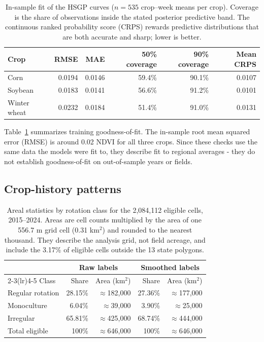 \documentclass[10pt,letterpaper]{article}
\begin{document}
\begin{table}[!htbp]
\centering\small
\begin{tabular}{@{}lrrrrr@{}}
\toprule
Crop & RMSE & MAE & 50\% coverage & 90\% coverage & Mean CRPS \\
\midrule
Corn & 0.0194 & 0.0146 & 59.4\% & 90.1\% & 0.0107 \\
Soybean & 0.0183 & 0.0141 & 56.6\% & 91.2\% & 0.0101 \\
Winter wheat & 0.0232 & 0.0184 & 51.4\% & 91.0\% & 0.0131 \\
\bottomrule
\end{tabular}
\caption{In-sample fit of the HSGP curves ($n=535$ crop--week means per crop). Coverage is the share of observations inside the stated posterior predictive band. The continuous ranked probability score (CRPS) rewards predictive distributions that are both accurate and sharp; lower is better.}
\label{tab:fit}
\end{table}

Table~\ref{tab:fit} summarizes training goodness-of-fit. The in-sample root mean squared error (RMSE) is around 0.02 NDVI for all three crops. Since these checks use the same data the models were fit to, they describe fit to regional averages - they do not establish goodness-of-fit on out-of-sample years or fields.

\FloatBarrier\subsection{Crop-history patterns}\label{sec:result-rotation}

\begin{table}[!htbp]
\centering\small
\begin{tabular}{@{}lrrrr@{}}
\toprule
& \multicolumn{2}{c}{Raw labels} & \multicolumn{2}{c}{Smoothed labels} \\
\cmidrule(lr){2-3}\cmidrule(lr){4-5}
Class & Share & Area (km$^2$) & Share & Area (km$^2$) \\
\midrule
Regular rotation & 28.15\% & $\approx$182,000 & 27.36\% & $\approx$177,000 \\
Monoculture & 6.04\% & $\approx$39,000 & 3.90\% & $\approx$25,000 \\
Irregular & 65.81\% & $\approx$425,000 & 68.74\% & $\approx$444,000 \\
Total eligible & 100\% & $\approx$646,000 & 100\% & $\approx$646,000 \\
\bottomrule
\end{tabular}
\caption{Areal statistics by rotation class for the 2,084,112 eligible cells, 2015--2024. Areas are cell counts multiplied by the area of one 556.7 m grid cell (0.31 km$^2$) and rounded to the nearest thousand. They describe the analysis grid, not field acreage, and include the 3.17\% of eligible cells outside the 13 state polygons.}
\label{tab:rotation}
\end{table}
\end{document}
